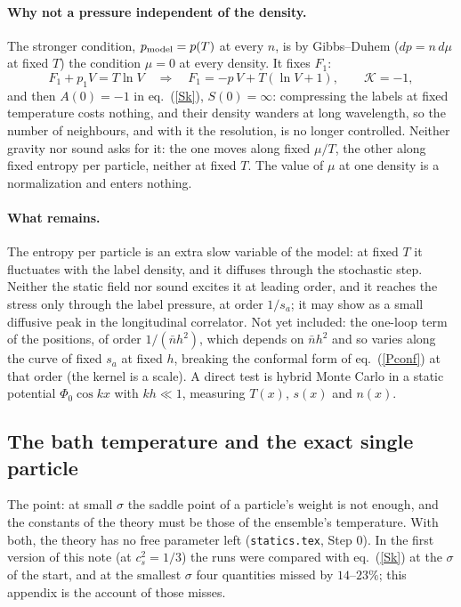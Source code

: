 \documentclass[11pt,aps,preprint,nofootinbib,superscriptaddress,tightenlines]{revtex4-2}
\def\st{\begin{equation}}
\def\stp{\end{equation}}
\def\Eq#1{eq.~(\ref{#1})}
\let\oldparagraph\paragraph
\renewcommand{\paragraph}{\par\bigskip\oldparagraph}
\begin{document}
\paragraph{Why not a pressure independent of the density.}  The stronger condition, $p_{\rm model}=p(T)$ at every $n$, is by Gibbs--Duhem ($dp=n\,d\mu$ at
fixed $T$) the condition $\mu=0$ at every density.  It fixes $F_1$:
\st
F_1+p_1V=T\ln V\quad\Longrightarrow\quad F_1=-p\,V+T(\ln V+1),\qquad \mathcal K=-1,
\stp
and then $A(0)=-1$ in \Eq{Sk}, $S(0)=\infty$: compressing the labels at fixed temperature costs nothing, and their density wanders at long wavelength, so the
number of neighbours, and with it the resolution, is no longer controlled.  Neither gravity nor sound asks for it: the one moves along fixed $\mu/T$, the other along fixed entropy per particle, neither at fixed $T$.
The value of $\mu$ at one density is a normalization and enters nothing.

\paragraph{What remains.}  The entropy per particle is an extra slow variable of the model: at fixed $T$ it fluctuates with the label density, and it diffuses
through the stochastic step.  Neither the static field nor sound excites it at leading order, and it reaches the stress only through the label pressure, at
order $1/s_a$; it may show as a small diffusive peak in the longitudinal correlator.  Not yet included: the one-loop term of the positions, of order
$1/(\bar nh^2)$, which depends on $\bar nh^2$ and so varies along the curve of fixed $s_a$ at fixed $h$, breaking the conformal form of \Eq{Pconf} at that
order (the kernel is a scale).  A direct test is hybrid Monte Carlo in a static potential $\Phi_0\cos kx$ with $kh\ll1$, measuring $T(x)$, $s(x)$ and $n(x)$.

\subsection{The bath temperature and the exact single particle}
\label{app:misses}

The point: at small $\sigma$ the saddle point of a particle's weight is not enough, and the constants of the theory must be those of the ensemble's
temperature.  With both, the theory has no free parameter left (\texttt{statics.tex}, Step 0).  In the first version of this note (at $c_s^2=1/3$) the runs were compared
with \Eq{Sk} at the $\sigma$ of the start, and at the smallest $\sigma$ four quantities missed by $14$--$23\%$; this appendix is the account of those misses.
\end{document}
